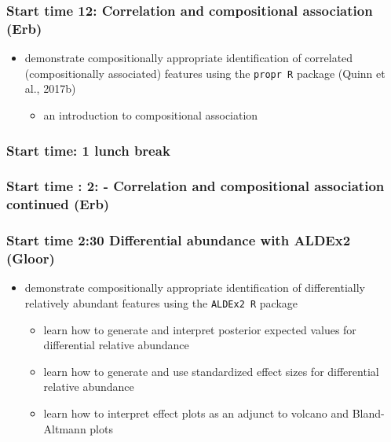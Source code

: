 \documentclass[twocolumn]{article}
\providecommand{\tightlist}{%
  \setlength{\itemsep}{0pt}\setlength{\parskip}{0pt}}
\begin{document}
\hypertarget{start-time-12-correlation-and-compositional-association-erb}{%
\subsubsection{Start time 12: Correlation and compositional association
(Erb)}\label{start-time-12-correlation-and-compositional-association-erb}}

\begin{itemize}
\tightlist
\item
  demonstrate compositionally appropriate identification of correlated
  (compositionally associated) features using the \texttt{propr\ R}
  package (Quinn et al., 2017b)

  \begin{itemize}
  \tightlist
  \item
    an introduction to compositional association
  \end{itemize}
\end{itemize}

\hypertarget{start-time-1-lunch-break}{%
\subsubsection{Start time: 1 lunch
break}\label{start-time-1-lunch-break}}

\hypertarget{start-time-2---correlation-and-compositional-association-continued-erb}{%
\subsubsection{Start time : 2: - Correlation and compositional
association continued
(Erb)}\label{start-time-2---correlation-and-compositional-association-continued-erb}}

\hypertarget{start-time-230-differential-abundance-with-aldex2-gloor}{%
\subsubsection{Start time 2:30 Differential abundance with ALDEx2
(Gloor)}\label{start-time-230-differential-abundance-with-aldex2-gloor}}

\begin{itemize}
\tightlist
\item
  demonstrate compositionally appropriate identification of
  differentially relatively abundant features using the
  \texttt{ALDEx2\ R} package

  \begin{itemize}
  \tightlist
  \item
    learn how to generate and interpret posterior expected values for
    differential relative abundance
  \item
    learn how to generate and use standardized effect sizes for
    differential relative abundance
  \item
    learn how to interpret effect plots as an adjunct to volcano and
    Bland-Altmann plots
  \end{itemize}
\end{itemize}
\end{document}
